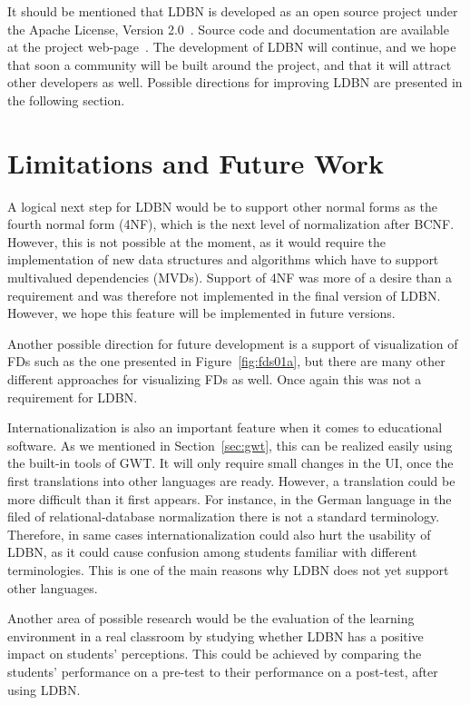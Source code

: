 It should be mentioned that LDBN is developed as an open source project 
under the Apache License, Version 2.0~\cite{walv2}. 
Source code and documentation are available at the project web-page~\cite{wldbnp}. 
The development of LDBN will continue, and we
hope that soon a community will be
built around the project, and that it will attract other developers as well. Possible directions for 
improving LDBN are presented in the following section. 

\section{Limitations and Future Work}
A logical next step for LDBN would be to support
other normal forms as the fourth normal form (4NF), which is the next level 
of normalization after BCNF.
However, this is not possible at the moment, as it would
require the implementation of new data structures and algorithms which have to 
support multivalued dependencies (MVDs). Support of 4NF was more of a desire than a requirement and
was therefore not implemented in the final version of LDBN. However, we hope this feature will be implemented
in future versions. 

Another possible direction for future development is a support of visualization of FDs such as the
one presented in Figure~\ref{fig:fds01a}, but there are many other different approaches for visualizing FDs as well.
Once again this was not a requirement for LDBN. 

Internationalization is also an important feature when it comes to educational software.
As we mentioned in Section~\ref{sec:gwt}, this can be realized easily using the built-in tools of GWT.
It will only require 
small changes in the UI, once the first translations into other languages are ready. However, a translation 
could be more difficult than it first appears. For instance, in the German language in the filed of relational-database
normalization
there is not a standard terminology. Therefore,
in same cases internationalization could also hurt the usability 
of LDBN, as it could cause confusion among students familiar with different terminologies.
This is one of the main reasons why LDBN does not yet support other languages.

Another area of possible research would be the evaluation of the learning environment 
in a real classroom by
studying whether LDBN has a positive impact on students' perceptions.
This could be achieved by comparing the students' performance on a pre-test to their
performance on a post-test, after using LDBN.  
